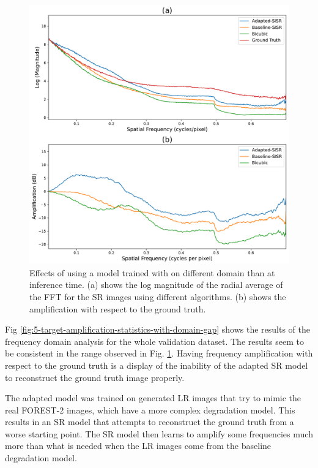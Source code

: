         \begin{figure}[H]
            \centering
            \includegraphics[scale=0.4]{Includes/5-target-prediction-with-domain-gap-fft.pdf}
            \caption{Effects of using a model trained with on different domain than at inference time. (a) shows the log magnitude of the radial average of the FFT for the SR images using different algorithms. (b) shows the amplification with respect to the ground truth.}
            \label{fig:5-target-prediction-with-domain-gap-fft}
        \end{figure}

        Fig \ref{fig:5-target-amplification-statistics-with-domain-gap} shows the results of the frequency domain analysis for the whole validation dataset. The results seem to be consistent in the range observed in Fig. \ref{fig:5-target-prediction-with-domain-gap-fft}. Having frequency amplification with respect to the ground truth is a display of the inability of the adapted SR model to reconstruct the ground truth image properly.
        
        The adapted model was trained on generated LR images that try to mimic the real FOREST-2 images, which have a more complex degradation model. This results in an SR model that attempts to reconstruct the ground truth from a worse starting point. The SR model then learns to amplify some frequencies much more than what is needed when the LR images come from the baseline degradation model.


